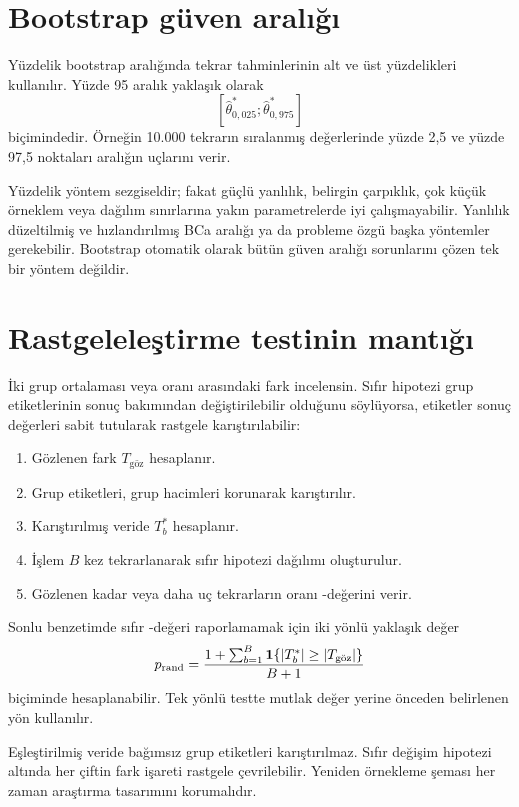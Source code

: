 \section{Bootstrap güven aralığı}
\label{sec:bootstrap-ci}

Yüzdelik bootstrap aralığında tekrar tahminlerinin alt ve üst yüzdelikleri
kullanılır. Yüzde 95 aralık yaklaşık olarak
\[
[\hat\theta^*_{0{,}025};\hat\theta^*_{0{,}975}]
\]
biçimindedir. Örneğin 10.000 tekrarın sıralanmış değerlerinde yüzde 2,5 ve
yüzde 97,5 noktaları aralığın uçlarını verir.

Yüzdelik yöntem sezgiseldir; fakat güçlü yanlılık, belirgin çarpıklık, çok
küçük örneklem veya dağılım sınırlarına yakın parametrelerde iyi çalışmayabilir.
Yanlılık düzeltilmiş ve hızlandırılmış BCa aralığı ya da probleme özgü başka
yöntemler gerekebilir. Bootstrap otomatik olarak bütün güven aralığı
sorunlarını çözen tek bir yöntem değildir.

\section{Rastgeleleştirme testinin mantığı}
\label{sec:randomization-test}

İki grup ortalaması veya oranı arasındaki fark incelensin. Sıfır hipotezi
grup etiketlerinin sonuç bakımından değiştirilebilir olduğunu söylüyorsa,
etiketler sonuç değerleri sabit tutularak rastgele karıştırılabilir:

\begin{enumerate}
  \item Gözlenen fark $T_{\text{göz}}$ hesaplanır.
  \item Grup etiketleri, grup hacimleri korunarak karıştırılır.
  \item Karıştırılmış veride $T_b^*$ hesaplanır.
  \item İşlem $B$ kez tekrarlanarak sıfır hipotezi dağılımı oluşturulur.
  \item Gözlenen kadar veya daha uç tekrarların oranı \pval-değerini verir.
\end{enumerate}

Sonlu benzetimde sıfır \pval-değeri raporlamamak için iki yönlü yaklaşık değer
\[
p_{\mathrm{rand}}
=\frac{1+\sum_{b=1}^{B}
\mathbf{1}\!\left\{|T_b^*|\geq|T_{\text{göz}}|\right\}}{B+1}
\]
biçiminde hesaplanabilir. Tek yönlü testte mutlak değer yerine önceden
belirlenen yön kullanılır.

Eşleştirilmiş veride bağımsız grup etiketleri karıştırılmaz. Sıfır değişim
hipotezi altında her çiftin fark işareti rastgele çevrilebilir. Yeniden
örnekleme şeması her zaman araştırma tasarımını korumalıdır.

